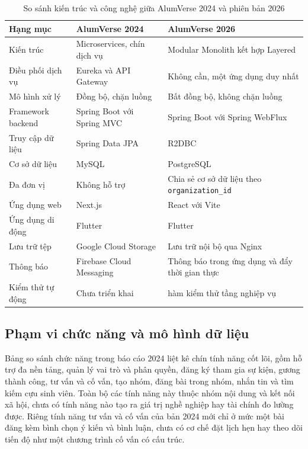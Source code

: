\documentclass[12pt,a4paper,oneside]{report}
\begin{document}
\renewcommand{\arraystretch}{1.25}
\begin{table}[H]
\centering
\small
\caption{So sánh kiến trúc và công nghệ giữa AlumVerse 2024 và phiên bản 2026}
\label{tab:compare2024}
\begin{tabular}{|>{\raggedright\arraybackslash}p{3.6cm}|>{\raggedright\arraybackslash}p{4.9cm}|>{\raggedright\arraybackslash}p{4.9cm}|}
\hline
\textbf{Hạng mục} & \textbf{AlumVerse 2024} & \textbf{AlumVerse 2026} \\ \hline
Kiến trúc & Microservices, chín dịch vụ & Modular Monolith kết hợp Layered \\ \hline
Điều phối dịch vụ & Eureka và API Gateway & Không cần, một ứng dụng duy nhất \\ \hline
Mô hình xử lý & Đồng bộ, chặn luồng & Bất đồng bộ, không chặn luồng \\ \hline
Framework backend & Spring Boot với Spring MVC & Spring Boot với Spring WebFlux \\ \hline
Truy cập dữ liệu & Spring Data JPA & R2DBC \\ \hline
Cơ sở dữ liệu & MySQL & PostgreSQL \\ \hline
Đa đơn vị & Không hỗ trợ & Chia sẻ cơ sở dữ liệu theo \texttt{organization\_id} \\ \hline
Ứng dụng web & Next.js & React với Vite \\ \hline
Ứng dụng di động & Flutter & Flutter \\ \hline
Lưu trữ tệp & Google Cloud Storage & Lưu trữ nội bộ qua Nginx \\ \hline
Thông báo & Firebase Cloud Messaging & Thông báo trong ứng dụng và đẩy thời gian thực \\ \hline
Kiểm thử tự động & Chưa triển khai & 196 hàm kiểm thử tầng nghiệp vụ \\ \hline
\end{tabular}
\end{table}
\renewcommand{\arraystretch}{1}

\subsection{Phạm vi chức năng và mô hình dữ liệu}

Bảng so sánh chức năng trong báo cáo 2024 liệt kê chín tính năng cốt lõi, gồm hỗ trợ đa nền tảng, quản lý vai trò và phân quyền, đăng ký tham gia sự kiện, gương thành công, tư vấn và cố vấn, tạo nhóm, đăng bài trong nhóm, nhắn tin và tìm kiếm cựu sinh viên. Toàn bộ các tính năng này thuộc nhóm nội dung và kết nối xã hội, chưa có tính năng nào tạo ra giá trị nghề nghiệp hay tài chính đo lường được. Riêng tính năng tư vấn và cố vấn của bản 2024 mới chỉ ở mức một bài đăng kèm bình chọn ý kiến và bình luận, chưa có cơ chế đặt lịch hẹn hay theo dõi tiến độ như một chương trình cố vấn có cấu trúc.
\end{document}

